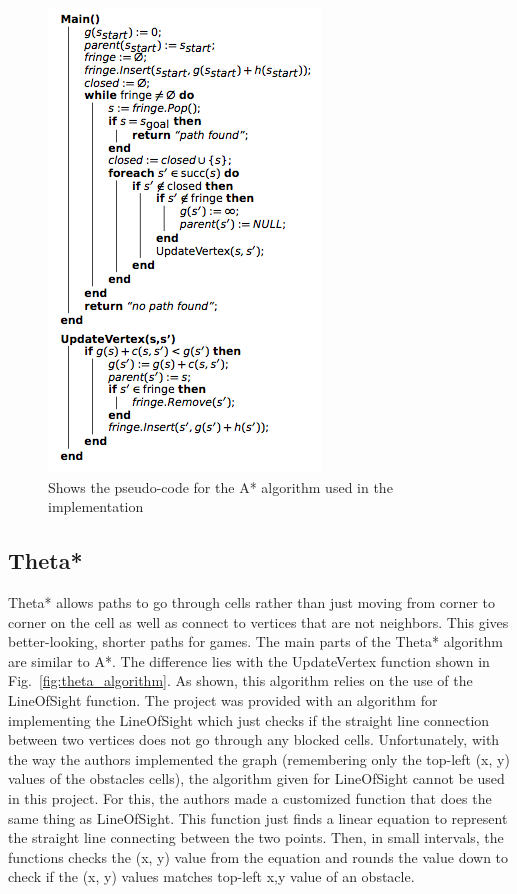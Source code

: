 \documentclass[a4paper,11pt]{report}
\begin{document}
	\begin{figure}[h!]
	    \includegraphics[width=.45\textwidth]{images/ai_algorithm.png}
	  \caption{Shows the pseudo-code for the A* algorithm used in the implementation}
	  \label{fig:ai_algorithm}
	\end{figure}
	
	\subsection{Theta*}
	Theta* allows paths to go through cells rather than just moving from corner to corner on the cell as well as connect to vertices that are not neighbors. This gives better-looking, shorter paths for games. The main parts of the Theta* algorithm are similar to A*. The difference lies with the UpdateVertex function shown in Fig.~\ref{fig:theta_algorithm}. As shown, this algorithm relies on the use of the LineOfSight function. The project was provided with an algorithm for implementing the LineOfSight which just checks if the straight line connection between two vertices does not go through any blocked cells. Unfortunately, with the way the authors implemented the graph (remembering only the top-left (x, y) values of the obstacles cells), the algorithm given for LineOfSight cannot be used in this project. For this, the authors made a customized function that does the same thing as LineOfSight. This function just finds a linear equation to represent the straight line connecting between the two points. Then, in small intervals, the functions checks the (x, y) value from the equation and rounds the value down to check if the (x, y) values matches top-left x,y value of an obstacle. 
	
\end{document}
